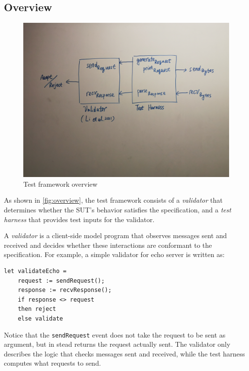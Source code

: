 \documentclass{article}
\newcommand{\ilc}[1]{\lstinline[style=customcoq]{#1}}
\theoremstyle{definition}
\begin{document}
\subsection{Overview}
\begin{figure}
  \centering
  \includegraphics[width=.9\textwidth]{figures/overview}
  \caption{Test framework overview}
  \label{fig:overview}
\end{figure}

As shown in \autoref{fig:overview}, the test framework consists of a {\em
  validator} that determines whether the SUT's behavior satisfies the
specification, and a {\em test harness} that provides test inputs for the
validator.

A {\em validator} is a client-side model program that observes messages sent and
received and decides whether these interactions are conformant to the
specification.  For example, a simple validator for echo server is written as:
\begin{lstlisting}[style=customcoq]
  let validateEcho =
    request := sendRequest();
    response := recvResponse();
    if response <> request
    then reject
    else validate
\end{lstlisting}
Notice that the \ilc{sendRequest} event does not take the request to be sent as
argument, but in stead returns the request actually sent.  The validator only
describes the logic that checks messages sent and received, while the test
harness computes what requests to send.
\end{document}
